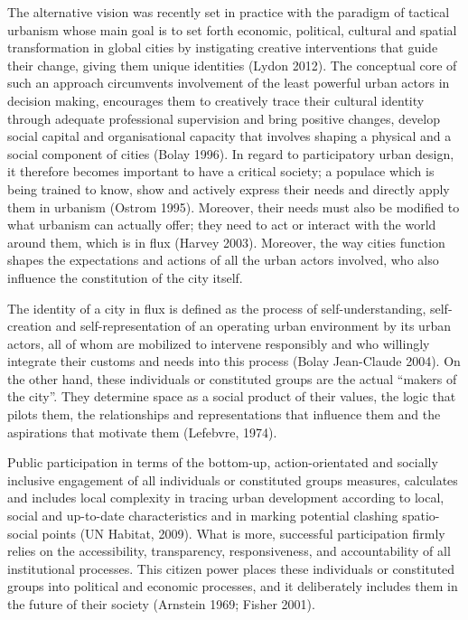 \documentclass[11pt]{report}
\begin{document}
The alternative vision was recently set in practice with the paradigm of tactical urbanism whose main goal is to set forth economic, political, cultural and spatial transformation in global cities by instigating creative interventions that guide their change, giving them unique identities (Lydon 2012). The conceptual core of such an approach circumvents involvement of the least powerful urban actors in decision making, encourages them to creatively trace their cultural identity through adequate professional supervision and bring positive changes, develop social capital and organisational capacity that involves shaping a physical and a social component of cities (Bolay 1996). In regard to participatory urban design, it therefore becomes important to have a critical society; a populace which is being trained to know, show and actively express their needs and directly apply them in urbanism (Ostrom 1995). Moreover, their needs must also be modified to what urbanism can actually offer; they need to act or interact with the world around them, which is in flux (Harvey 2003).
Moreover, the way cities function shapes the expectations and actions of all the urban actors involved, who also influence the constitution of the city itself.

The identity of a city in flux is defined as the process of self-understanding, self-creation and self-representation of an operating urban environment by its urban actors, all of whom are mobilized to intervene responsibly and who willingly integrate their customs and needs into this process (Bolay Jean-Claude 2004). On the other hand, these individuals or constituted groups are the actual “makers of the city”. They determine space as a social product of their values, the logic that pilots them, the relationships and representations that influence them and the aspirations that motivate them (Lefebvre, 1974).

Public participation in terms of the bottom-up, action-orientated and socially inclusive engagement of all individuals or constituted groups measures, calculates and includes local complexity in tracing urban development according to local, social and up-to-date characteristics and in marking potential clashing spatio-social points (UN Habitat, 2009). What is more, successful participation firmly relies on the accessibility, transparency, responsiveness, and accountability of all institutional processes. This citizen power places these individuals or constituted groups into political and economic processes, and it deliberately includes them in the future of their society (Arnstein 1969; Fisher 2001).
\end{document}
